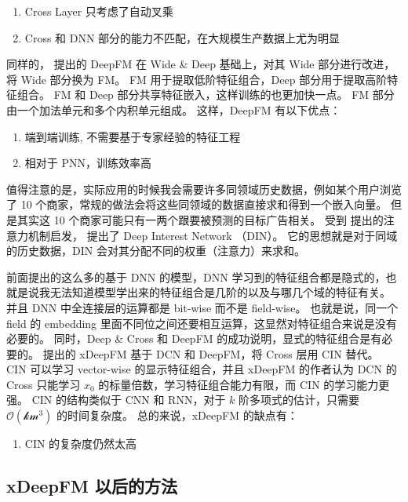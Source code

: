 \documentclass[degree=project,degree-type=project,cjk-font=noto]{thuthesis}
\begin{document}
\begin{enumerate}
  \item Cross Layer 只考虑了自动叉乘
  \item Cross 和 DNN 部分的能力不匹配，在大规模生产数据上尤为明显
\end{enumerate}

同样的，\cite{deepfm} 提出的 DeepFM 在 Wide \& Deep 基础上，对其 Wide 部分进行改进，将 Wide 部分换为 FM。
FM 用于提取低阶特征组合，Deep 部分用于提取高阶特征组合。
FM 和 Deep 部分共享特征嵌入，这样训练的也更加快一点。
FM 部分由一个加法单元和多个内积单元组成。
这样，DeepFM 有以下优点：

\begin{enumerate}
  \item 端到端训练, 不需要基于专家经验的特征工程
  \item 相对于 PNN，训练效率高
\end{enumerate}

值得注意的是，实际应用的时候我会需要许多同领域历史数据，例如某个用户浏览了 10 个商家，常规的做法会将这些同领域的数据直接求和得到一个嵌入向量。
但是其实这 10 个商家可能只有一两个跟要被预测的目标广告相关。
受到 \cite{attention} 提出的注意力机制启发，\cite{din} 提出了 Deep Interest Network （DIN）。
它的思想就是对于同域的历史数据，DIN 会对其分配不同的权重（注意力）来求和。

前面提出的这么多的基于 DNN 的模型，DNN 学习到的特征组合都是隐式的，也就是说我无法知道模型学出来的特征组合是几阶的以及与哪几个域的特征有关。
并且 DNN 中全连接层的运算都是 bit-wise 而不是 field-wise。
也就是说，同一个 field 的 embedding 里面不同位之间还要相互运算，这显然对特征组合来说是没有必要的。
同时，Deep \& Cross 和 DeepFM 的成功说明，显式的特征组合是有必要的。
\cite{xdeepfm} 提出的 xDeepFM 基于 DCN 和 DeepFM，将 Cross 层用 CIN 替代。
CIN 可以学习 vector-wise 的显示特征组合，并且 xDeepFM 的作者认为 DCN 的 Cross 只能学习 $x_0$ 的标量倍数，学习特征组合能力有限，而 CIN 的学习能力更强。
CIN 的结构类似于 CNN 和 RNN，对于 $k$ 阶多项式的估计，只需要 $\mathcal{O(km^3)}$ 的时间复杂度。
总的来说，xDeepFM 的缺点有：

\begin{enumerate}
  \item CIN 的复杂度仍然太高
\end{enumerate}

\subsection{xDeepFM 以后的方法}
\label{sec:after_xeepfm}
\end{document}
